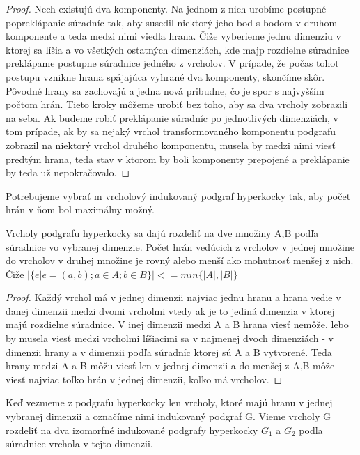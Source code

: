 \begin{proof}
Nech existujú dva komponenty. Na jednom z nich urobíme 
postupné popreklápanie súradníc tak, aby susedil niektorý jeho bod s bodom
v druhom komponente a teda medzi nimi viedla hrana. Čiže vyberieme jednu
dimenziu v ktorej sa líšia a vo všetkých ostatných dimenziách, kde majp
rozdielne súradnice preklápame postupne súradnice jedného z vrcholov. 
V prípade, že počas tohot postupu vznikne hrana spájajúca vyhrané dva
komponenty, skončíme skôr. Pôvodné hrany sa
zachovajú a jedna nová pribudne, čo je spor s najvyšším počtom hrán.
Tieto kroky môžeme urobiť bez toho, aby sa dva vrcholy zobrazili na seba.
Ak budeme robiť preklápanie súradníc po jednotlivých dimenziách,
v tom prípade, ak by sa nejaký vrchol transformovaného komponentu
podgrafu zobrazil na niektorý vrchol druhého komponentu, musela by 
medzi nimi viesť predtým hrana, teda stav v ktorom by boli komponenty
prepojené a preklápanie by teda už nepokračovalo.
\end{proof}

Potrebujeme vybrať m vrcholový indukovaný podgraf hyperkocky tak, aby počet 
hrán v ňom bol maximálny možný.

\begin{veta}
Vrcholy podgrafu hyperkocky sa dajú rozdeliť na dve množiny A,B podľa súradnice vo
vybranej dimenzie. Počet hrán vedúcich z vrcholov v jednej množine do
vrcholov v druhej množine je rovný alebo menší ako mohutnosť menšej z nich.
Čiže $|\{e|e = (a,b);a \in A; b \in B\}| <= min\{|A|,|B|\}$
\end{veta}
\begin{proof}
Každý vrchol má v jednej dimenzii najviac jednu hranu a hrana vedie v
danej dimenzii medzi dvomi vrcholmi vtedy ak je to jediná dimenzia v ktorej
majú rozdielne súradnice. V inej dimenzii medzi A a B hrana viesť nemôže,
lebo by musela viesť medzi vrcholmi líšiacimi sa v najmenej dvoch 
dimenziách - v dimenzii hrany a v dimenzii podľa súradníc ktorej 
sú A a B vytvorené. Teda hrany medzi A a B môžu viesť len v jednej dimenzii
a do menšej z A,B môže viesť najviac toľko hrán v jednej dimenzii, koľko má
vrcholov.
\end{proof}

\begin{veta}
\label{izomorfne}
Keď vezmeme z podgrafu hyperkocky len vrcholy, ktoré majú hranu v jednej
vybranej dimenzii a označíme nimi indukovaný podgraf G. Vieme vrcholy G
rozdeliť na dva izomorfné indukované podgrafy hyperkocky $G_{1}$ a $G_{2}$
podľa súradnice vrchola v tejto dimenzii.
\end{veta}


